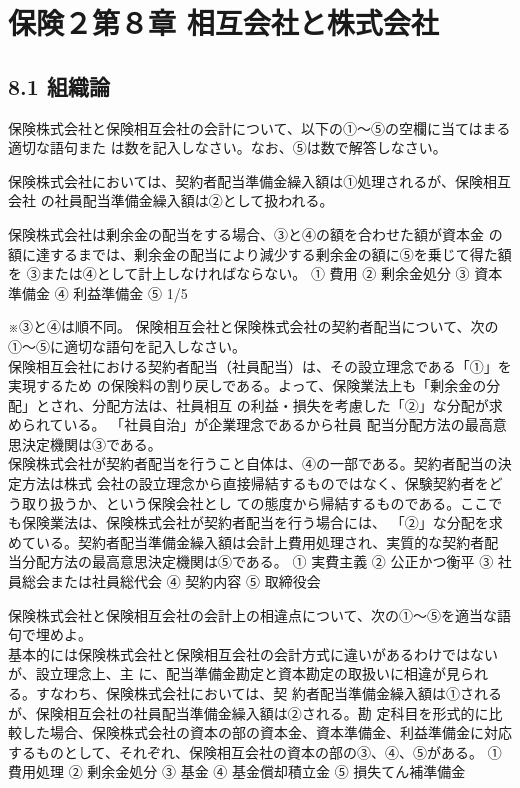 \documentclass[report,gutter=10mm,fore-edge=10mm,uplatex,dvipdfmx]{jlreq}
\begin{document}
\chapter{保険２第８章 相互会社と株式会社}
\section{8.1 組織論}
保険株式会社と保険相互会社の会計について、以下の①～⑤の空欄に当てはまる適切な語句また
は数を記入しなさい。なお、⑤は数で解答しなさい。

保険株式会社においては、契約者配当準備金繰入額は①処理されるが、保険相互会社
の社員配当準備金繰入額は②として扱われる。

保険株式会社は剰余金の配当をする場合、③と④の額を合わせた額が資本金
の額に達するまでは、剰余金の配当により減少する剰余金の額に⑤を乗じて得た額を
③または④として計上しなければならない。
① 費用  ② 剰余金処分  ③ 資本準備金  ④ 利益準備金  ⑤ 1/5

※③と④は順不同。
保険相互会社と保険株式会社の契約者配当について、次の①～⑤に適切な語句を記入しなさい。\\
保険相互会社における契約者配当（社員配当）は、その設立理念である「①」を実現するため
の保険料の割り戻しである。よって、保険業法上も「剰余金の分配」とされ、分配方法は、社員相互
の利益・損失を考慮した「②」な分配が求められている。
「社員自治」が企業理念であるから社員
配当分配方法の最高意思決定機関は③である。\\
保険株式会社が契約者配当を行うこと自体は、④の一部である。契約者配当の決定方法は株式
会社の設立理念から直接帰結するものではなく、保験契約者をどう取り扱うか、という保険会社とし
ての態度から帰結するものである。ここでも保険業法は、保険株式会社が契約者配当を行う場合には、
「②」な分配を求めている。契約者配当準備金繰入額は会計上費用処理され、実質的な契約者配
当分配方法の最高意思決定機関は⑤である。
① 実費主義 
② 公正かつ衡平 
③ 社員総会または社員総代会 
④ 契約内容 
⑤ 取締役会

保険株式会社と保険相互会社の会計上の相違点について、次の①～⑤を適当な語句で埋めよ。\\
基本的には保険株式会社と保険相互会社の会計方式に違いがあるわけではないが、設立理念上、主
に、配当準備金勘定と資本勘定の取扱いに相違が見られる。すなわち、保険株式会社においては、契
約者配当準備金繰入額は①されるが、保険相互会社の社員配当準備金繰入額は②される。勘
定科目を形式的に比較した場合、保険株式会社の資本の部の資本金、資本準備金、利益準備金に対応
するものとして、それぞれ、保険相互会社の資本の部の③、④、⑤がある。
① 費用処理 
② 剰余金処分 
③ 基金 
④ 基金償却積立金 
⑤ 損失てん補準備金 
\end{document}
